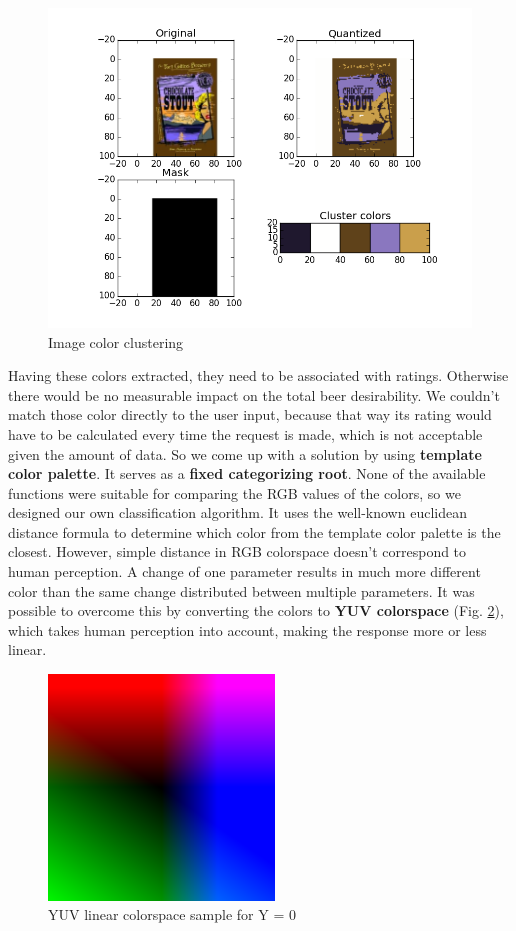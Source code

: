\documentclass[10pt]{IEEEtran}
\begin{document}
\begin{figure}[b]
  \centering
  \includegraphics[width=\columnwidth]{./graphics/1.png}
  \caption{Image color clustering}
  \label{fig:colorClustering}
\end{figure}

Having these colors extracted, they need to be associated with ratings. Otherwise there would be no measurable impact on the total beer desirability. We couldn't match those color directly to the user input, because that way its rating would have to be calculated  every time the request is made, which is not acceptable given the amount of data. So we come up with a solution by using \textbf{template color palette}. It serves as a \textbf{fixed categorizing root}. None of the available functions were suitable for comparing the RGB values of the colors, so we designed our own classification algorithm. It uses the well-known euclidean distance formula to determine which color from the template color palette is the closest. However, simple distance in RGB colorspace doesn't correspond to human perception. A change of one parameter results in much more different color than the same change distributed between multiple parameters. It was possible to overcome this by converting the colors to \textbf{YUV colorspace} (Fig. \ref{fig:colorspace}), which takes human perception into account, making the response more or less linear. 


\begin{figure}[t]
  \centering
  \includegraphics[width=6cm]{./graphics/YUV.png}
  \caption{YUV linear colorspace sample for Y = 0}
  \label{fig:colorspace}
\end{figure}
\end{document}
